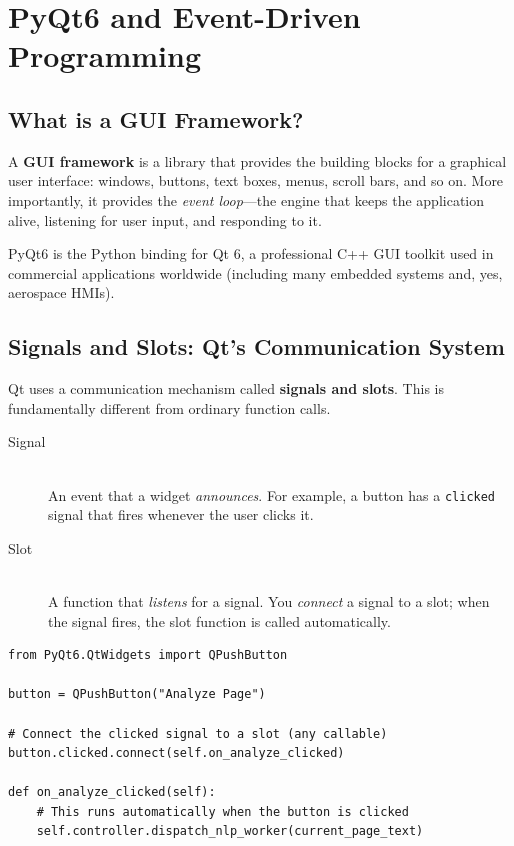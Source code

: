 \documentclass[12pt,oneside]{book}
\begin{document}
\chapter{PyQt6 and Event-Driven Programming}
\label{ch:pyqt6}

\section{What is a GUI Framework?}

A \textbf{GUI framework} is a library that provides the building blocks for a graphical
user interface: windows, buttons, text boxes, menus, scroll bars, and so on. More
importantly, it provides the \textit{event loop}—the engine that keeps the application
alive, listening for user input, and responding to it.

PyQt6 is the Python binding for Qt 6, a professional C++ GUI toolkit used in commercial
applications worldwide (including many embedded systems and, yes, aerospace HMIs).

\section{Signals and Slots: Qt's Communication System}

Qt uses a communication mechanism called \textbf{signals and slots}. This is fundamentally
different from ordinary function calls.

\begin{description}
  \item[Signal] \hfill \\
    An event that a widget \textit{announces}. For example, a button has a
    \texttt{clicked} signal that fires whenever the user clicks it.
  \item[Slot] \hfill \\
    A function that \textit{listens} for a signal. You \textit{connect} a signal to a
    slot; when the signal fires, the slot function is called automatically.
\end{description}

\begin{lstlisting}[caption={Signal and slot example in PyQt6}]
from PyQt6.QtWidgets import QPushButton

button = QPushButton("Analyze Page")

# Connect the clicked signal to a slot (any callable)
button.clicked.connect(self.on_analyze_clicked)

def on_analyze_clicked(self):
    # This runs automatically when the button is clicked
    self.controller.dispatch_nlp_worker(current_page_text)
\end{lstlisting}
\end{document}
